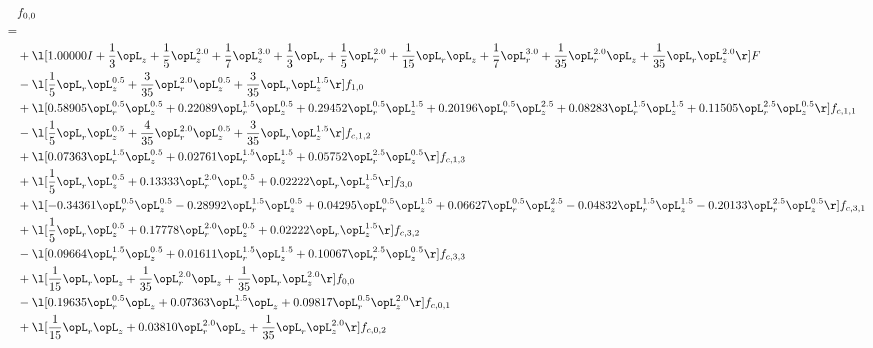 \begin{alignat}{2} 
\label{eq:f_00_1} 
& f_{0,0} \nonumber \\ 
 = \\ 
& + \l[  1.00000 I + \frac{1}{3} \opL_z + \frac{1}{5} \opL_z^{2.0} + \frac{1}{7} \opL_z^{3.0} + \frac{1}{3} \opL_r + \frac{1}{5} \opL_r^{2.0} + \frac{1}{15} \opL_r \opL_z + \frac{1}{7} \opL_r^{3.0} + \frac{1}{35} \opL_r^{2.0} \opL_z + \frac{1}{35} \opL_r \opL_z^{2.0}  \r] F \nonumber \\ 
& - \l[ \frac{1}{5} \opL_r \opL_z^{0.5} + \frac{3}{35} \opL_r^{2.0} \opL_z^{0.5} + \frac{3}{35} \opL_r \opL_z^{1.5}  \r] f_{1,0} \nonumber \\ 
& + \l[  0.58905 \opL_r^{0.5} \opL_z^{0.5} +  0.22089 \opL_r^{1.5} \opL_z^{0.5} +  0.29452 \opL_r^{0.5} \opL_z^{1.5} +  0.20196 \opL_r^{0.5} \opL_z^{2.5} +  0.08283 \opL_r^{1.5} \opL_z^{1.5} +  0.11505 \opL_r^{2.5} \opL_z^{0.5}  \r] f_{c,1,1} \nonumber \\ 
& - \l[ \frac{1}{5} \opL_r \opL_z^{0.5} + \frac{4}{35} \opL_r^{2.0} \opL_z^{0.5} + \frac{3}{35} \opL_r \opL_z^{1.5}  \r] f_{c,1,2} \nonumber \\ 
& + \l[  0.07363 \opL_r^{1.5} \opL_z^{0.5} +  0.02761 \opL_r^{1.5} \opL_z^{1.5} +  0.05752 \opL_r^{2.5} \opL_z^{0.5}  \r] f_{c,1,3} \nonumber \\ 
& + \l[ \frac{1}{5} \opL_r \opL_z^{0.5} +  0.13333 \opL_r^{2.0} \opL_z^{0.5} +  0.02222 \opL_r \opL_z^{1.5}  \r] f_{3,0} \nonumber \\ 
& + \l[  -0.34361 \opL_r^{0.5} \opL_z^{0.5}   -0.28992 \opL_r^{1.5} \opL_z^{0.5} +  0.04295 \opL_r^{0.5} \opL_z^{1.5} +  0.06627 \opL_r^{0.5} \opL_z^{2.5}   -0.04832 \opL_r^{1.5} \opL_z^{1.5}   -0.20133 \opL_r^{2.5} \opL_z^{0.5}  \r] f_{c,3,1} \nonumber \\ 
& + \l[ \frac{1}{5} \opL_r \opL_z^{0.5} +  0.17778 \opL_r^{2.0} \opL_z^{0.5} +  0.02222 \opL_r \opL_z^{1.5}  \r] f_{c,3,2} \nonumber \\ 
& - \l[  0.09664 \opL_r^{1.5} \opL_z^{0.5} +  0.01611 \opL_r^{1.5} \opL_z^{1.5} +  0.10067 \opL_r^{2.5} \opL_z^{0.5}  \r] f_{c,3,3} \nonumber \\ 
& + \l[ \frac{1}{15} \opL_r \opL_z + \frac{1}{35} \opL_r^{2.0} \opL_z + \frac{1}{35} \opL_r \opL_z^{2.0}  \r] f_{0,0} \nonumber \\ 
& - \l[  0.19635 \opL_r^{0.5} \opL_z +  0.07363 \opL_r^{1.5} \opL_z +  0.09817 \opL_r^{0.5} \opL_z^{2.0}  \r] f_{c,0,1} \nonumber \\ 
& + \l[ \frac{1}{15} \opL_r \opL_z +  0.03810 \opL_r^{2.0} \opL_z + \frac{1}{35} \opL_r \opL_z^{2.0}  \r] f_{c,0,2} \nonumber \\ 

\end{alignat}
